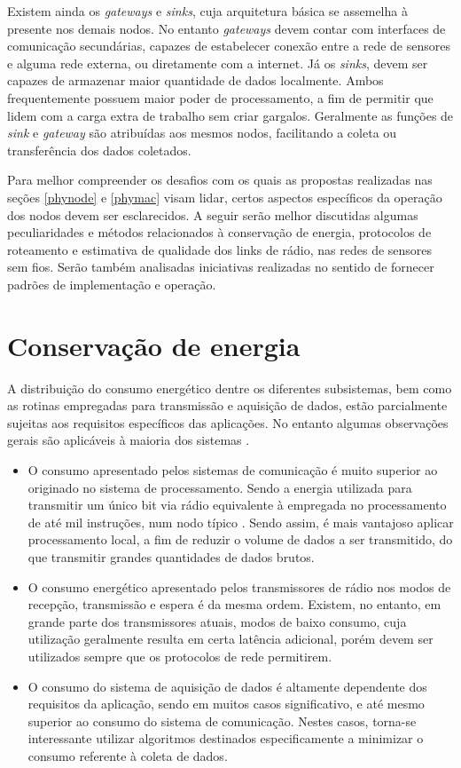 \documentclass[
	12pt,				%
	openright,			%
	oneside,
	a4paper,			%
	english,			%
	french,				%
	spanish,			%
	brazil				%
	]{abntex2}
\begin{document}
Existem ainda os \textit{gateways} e \textit{sinks}, cuja arquitetura básica se assemelha à presente nos demais nodos. No entanto \textit{gateways} devem contar com interfaces de comunicação secundárias, capazes de estabelecer conexão entre a rede de sensores e alguma rede externa, ou diretamente com a internet. Já os \textit{sinks}, devem ser capazes de armazenar maior quantidade de dados localmente. Ambos frequentemente possuem maior poder de processamento, a fim de permitir que lidem com a carga extra de trabalho sem criar gargalos. Geralmente as funções de \textit{sink} e \textit{gateway} são atribuídas aos mesmos nodos, facilitando a coleta ou transferência dos dados coletados.

Para melhor compreender os desafios com os quais as propostas realizadas nas seções \ref{phynode} e \ref{phymac} visam lidar, certos aspectos específicos da operação dos nodos devem ser esclarecidos. A seguir serão melhor discutidas algumas peculiaridades e métodos relacionados à conservação de energia, protocolos de roteamento e estimativa de qualidade dos links de rádio, nas redes de sensores sem fios. Serão também analisadas iniciativas realizadas no sentido de fornecer padrões de implementação e operação.

\section{Conservação de energia}
A distribuição do consumo energético dentre os diferentes subsistemas, bem como as rotinas empregadas para transmissão e aquisição de dados, estão parcialmente sujeitas aos requisitos específicos das aplicações. No entanto algumas observações gerais são aplicáveis à maioria dos sistemas \cite{Anastasi2009}.

\begin{itemize}
	\item O consumo apresentado pelos sistemas de comunicação é muito superior ao originado no sistema de processamento. Sendo a energia utilizada para transmitir um único bit via rádio equivalente à empregada no processamento de até mil instruções, num nodo típico \cite{Pottie2000}. Sendo assim, é mais vantajoso aplicar processamento local, a fim de reduzir o volume de dados a ser transmitido, do que transmitir grandes quantidades de dados brutos.
	\item O consumo energético apresentado pelos transmissores de rádio nos modos de recepção, transmissão e espera é da mesma ordem. Existem, no entanto, em grande parte dos transmissores atuais, modos de baixo consumo, cuja utilização geralmente resulta em certa latência adicional, porém devem ser utilizados sempre que os protocolos de rede permitirem.
	\item O consumo do sistema de aquisição de dados é altamente dependente dos requisitos da aplicação, sendo em muitos casos significativo, e até mesmo superior ao consumo do sistema de comunicação. Nestes casos, torna-se interessante utilizar algoritmos destinados especificamente a minimizar o consumo referente à coleta de dados.
\end{itemize}
\end{document}
